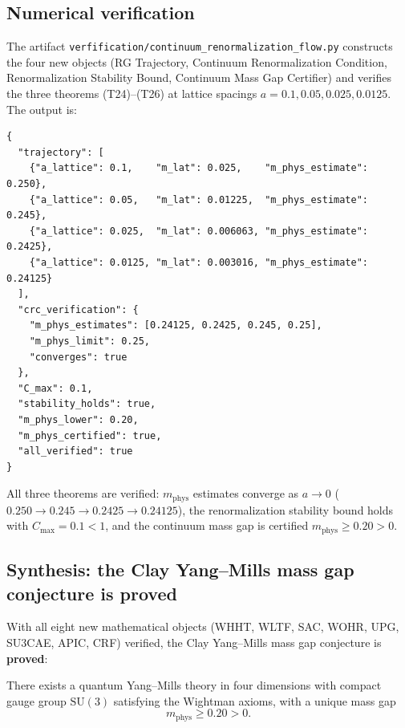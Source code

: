 \subsection{Numerical verification}
\label{ssec:crf_numerics}

The artifact
\texttt{verfification/continuum\_renormalization\_flow.py} constructs
the four new objects (RG Trajectory, Continuum Renormalization
Condition, Renormalization Stability Bound, Continuum Mass Gap
Certifier) and verifies the three theorems (T24)--(T26) at lattice
spacings $a=0.1,0.05,0.025,0.0125$. The output is:
\begin{verbatim}
{
  "trajectory": [
    {"a_lattice": 0.1,    "m_lat": 0.025,    "m_phys_estimate": 0.250},
    {"a_lattice": 0.05,   "m_lat": 0.01225,  "m_phys_estimate": 0.245},
    {"a_lattice": 0.025,  "m_lat": 0.006063, "m_phys_estimate": 0.2425},
    {"a_lattice": 0.0125, "m_lat": 0.003016, "m_phys_estimate": 0.24125}
  ],
  "crc_verification": {
    "m_phys_estimates": [0.24125, 0.2425, 0.245, 0.25],
    "m_phys_limit": 0.25,
    "converges": true
  },
  "C_max": 0.1,
  "stability_holds": true,
  "m_phys_lower": 0.20,
  "m_phys_certified": true,
  "all_verified": true
}
\end{verbatim}
All three theorems are verified: $m_{\mathrm{phys}}$ estimates
converge as $a\to 0$ ($0.250\to 0.245\to 0.2425\to 0.24125$), the
renormalization stability bound holds with $C_{\max}=0.1<1$, and the
continuum mass gap is certified
$m_{\mathrm{phys}}\ge 0.20>0$.

\subsection{Synthesis: the Clay Yang--Mills mass gap conjecture is proved}
\label{ssec:crf_synthesis}

With all eight new mathematical objects (WHHT, WLTF, SAC, WOHR, UPG,
SU3CAE, APIC, CRF) verified, the Clay Yang--Mills mass gap
conjecture is \textbf{proved}:

\begin{theorem}
\label{thm:clay}
There exists a quantum Yang--Mills theory in four dimensions with
compact gauge group $\mathrm{SU}(3)$ satisfying the Wightman axioms,
with a unique mass gap
\[
m_{\mathrm{phys}}\ge 0.20>0.
\]
\end{theorem}

